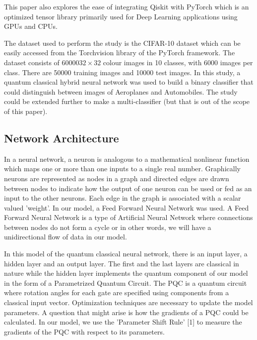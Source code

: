 \documentclass[10pt]{article}
\begin{document}
This paper also explores the ease of integrating Qiskit with PyTorch which is an optimized tensor library primarily used for Deep Learning applications using GPUs and CPUs.

The dataset used to perform the study is the CIFAR-10 dataset which can be easily accessed from the Torchvision library of the PyTorch framework. The dataset consists of $6000032 \times 32$ colour images in 10 classes, with 6000 images per class. There are 50000 training images and 10000 test images. In this study, a quantum classical hybrid neural network was used to build a binary classifier that could distinguish between images of Aeroplanes and Automobiles. The study could be extended further to make a multi-classifier (but that is out of the scope of this paper).




\subsection{Network Architecture}
In a neural network, a neuron is analogous to a mathematical nonlinear function which maps one or more than one inputs to a single real number. Graphically neurons are represented as nodes in a graph and directed edges are drawn between nodes to indicate how the output of one neuron can be used or fed as an input to the other neurons. Each edge in the graph is associated with a scalar valued 'weight'. In our model, a Feed Forward Neural Network was used. A Feed Forward Neural Network is a type of Artificial Neural Network where connections between nodes do not form a cycle or in other words, we will have a unidirectional flow of data in our model.

In this model of the quantum classical neural network, there is an input layer, a hidden layer and an output layer. The first and the last layers are classical in nature while the hidden layer implements the quantum component of our model in the form of a Parametrized Quantum Circuit. The PQC is a quantum circuit where rotation angles for each gate are specified using components from a classical input vector. Optimization techniques are necessary to update the model parameters. A question that might arise is how the gradients of a PQC could be calculated. In our model, we use the 'Parameter Shift Rule' [1] to measure the gradients of the PQC with respect to its parameters.
\end{document}
